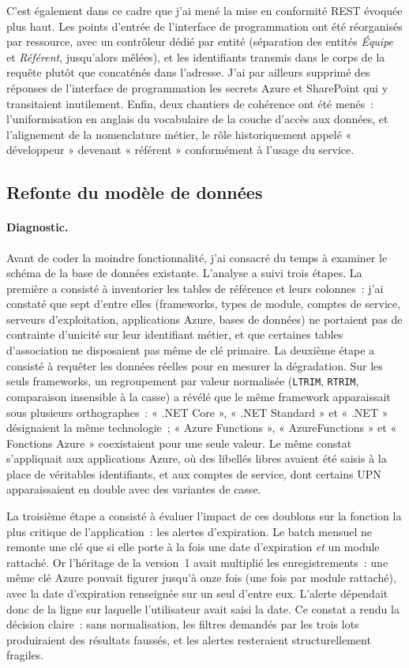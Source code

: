 C'est également dans ce cadre que j'ai mené la mise en conformité REST évoquée
plus haut. Les points d'entrée de l'interface de programmation ont été
réorganisés par ressource, avec un contrôleur dédié par entité (séparation
des entités \textit{Équipe} et \textit{Référent}, jusqu'alors mêlées), et les
identifiants transmis dans le corps de la requête plutôt que concaténés dans
l'adresse. J'ai par ailleurs supprimé des réponses de l'interface de
programmation les secrets Azure et SharePoint qui y transitaient inutilement.
Enfin, deux chantiers de cohérence ont été menés~: l'uniformisation en anglais
du vocabulaire de la couche d'accès aux données, et l'alignement de la
nomenclature métier, le rôle historiquement appelé « développeur » devenant
« référent » conformément à l'usage du service.

\subsection{Refonte du modèle de données}
\label{sec:normalisation-csbag}

\paragraph{Diagnostic.}
Avant de coder la moindre fonctionnalité, j'ai consacré du temps à examiner le
schéma de la base de données existante. L'analyse a suivi trois étapes. La
première a consisté à inventorier les tables de référence et leurs colonnes~: j'ai
constaté que sept d'entre elles (frameworks, types de module, comptes de
service, serveurs d'exploitation, applications Azure, bases de données) ne
portaient pas de contrainte d'unicité sur leur identifiant métier, et que
certaines tables d'association ne disposaient pas même de clé primaire. La
deuxième étape a consisté à requêter les données réelles pour en mesurer la
dégradation. Sur les seuls frameworks, un regroupement par valeur normalisée
(\texttt{LTRIM}, \texttt{RTRIM}, comparaison insensible à la casse) a révélé
que le même framework apparaissait sous plusieurs orthographes~: « .NET Core »,
« .NET Standard » et « .NET » désignaient la même technologie~; « Azure
Functions », « AzureFunctions » et « Fonctions Azure » coexistaient pour une
seule valeur. Le même constat s'appliquait aux applications Azure, où des
libellés libres avaient été saisis à la place de véritables identifiants, et aux
comptes de service, dont certains UPN apparaissaient en double avec des
variantes de casse.

La troisième étape a consisté à évaluer l'impact de ces doublons sur la
fonction la plus critique de l'application~: les alertes d'expiration. Le batch
mensuel ne remonte une clé que si elle porte à la fois une date d'expiration
\textit{et} un module rattaché. Or l'héritage de la version~1 avait multiplié
les enregistrements~: une même clé Azure pouvait figurer jusqu'à onze fois
(une fois par module rattaché), avec la date d'expiration renseignée sur
un seul d'entre eux. L'alerte dépendait donc de la ligne sur laquelle
l'utilisateur avait saisi la date. Ce constat a rendu la décision claire~: sans
normalisation, les filtres demandés par les trois lots produiraient des
résultats faussés, et les alertes resteraient structurellement fragiles.

